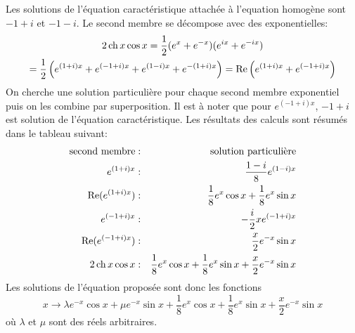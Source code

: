 Les solutions de l'équation caractéristique attachée à l'equation homogène sont $-1+i$ et $-1-i$. Le second membre se décompose avec des exponentielles:
\begin{multline*}
 2\operatorname{ch} x \cos x =\dfrac{1}{2}(e^{x}+e^{-x})(e^{ix}+e^{-ix}) \\
= \dfrac{1}{2}\left(e^{(1+i)x}+e^{(-1+i)x}+e^{(1-i)x}+e^{-(1+i)x} \right)
=\operatorname{Re}\left( e^{(1+i)x}+e^{(-1+i)x}\right)  
\end{multline*}
On cherche une solution particulière pour chaque second membre exponentiel puis on les combine par superposition. Il est à noter que pour $e^{(-1+i)x}$, $-1+i$ est solution de l'équation caractéristique. Les résultats des calculs sont résumés dans le tableau suivant:
\begin{align*}
\text{second membre} &:& \text{solution particulière} \\ 
e^{(1+i)x} &:&  \frac{1-i}{8}e^{(1-i)x} \\ 
\operatorname{Re}(e^{(1+i)x}) &:&  \frac{1}{8}e^x\cos x +\frac{1}{8}e^x\sin x\\ 
e^{(-1+i)x} &:& -\frac{i}{2}xe^{(-1+i)x} \\ 
\operatorname{Re}(e^{(-1+i)x}) &:& \frac{x}{2}e^{-x}\sin x \\
2\operatorname{ch} x \cos x &:& \frac{1}{8}e^x\cos x +\frac{1}{8}e^x\sin x + \frac{x}{2}e^{-x}\sin x 
\end{align*}
Les solutions de l'équation proposée sont donc les fonctions
\begin{displaymath}
 x\rightarrow \lambda e^{-x}\cos x + \mu e^{-x}\sin x +\frac{1}{8}e^x\cos x +\frac{1}{8}e^x\sin x + \frac{x}{2}e^{-x}\sin x
\end{displaymath}
où $\lambda$ et $\mu$ sont des réels arbitraires.